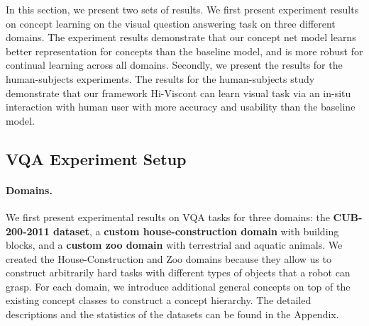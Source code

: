 




\begin{table}[t]
\caption{The average F1 score and standard deviation of Hi-Viscont and FALCON on the test concepts across all the three domains.}
\label{tab:test_three}
\end{table}



In this section, we present two sets of results.
We first present experiment results on concept learning on the visual question answering task on three different domains.
The experiment results demonstrate that our concept net model learns better representation for concepts than the baseline model, and is more robust for continual learning across all domains.
Secondly, we present the results for the human-subjects experiments.
The results for the human-subjects study demonstrate that our framework Hi-Viscont can learn visual task via an in-situ interaction with human user with more accuracy and usability than the baseline model. 

\subsection{VQA Experiment Setup}
\paragraph{Domains.} We first present experimental results on VQA tasks for three domains: the \textbf{CUB-200-2011 dataset}, a \textbf{custom house-construction domain} with building blocks, and a \textbf{custom zoo domain} with terrestrial and aquatic animals. 
We created the House-Construction and Zoo domains because they allow us to construct arbitrarily hard tasks with different types of objects that a robot can grasp.
For each domain, we introduce additional general concepts on top of the existing concept classes to construct a concept hierarchy. The detailed descriptions and the statistics of the datasets can be found in the Appendix.

